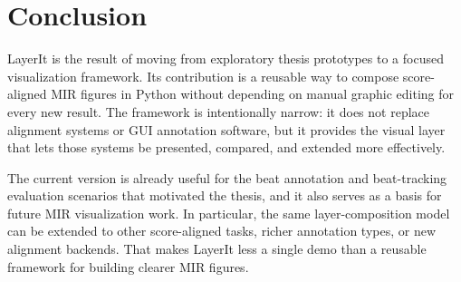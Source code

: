 \documentclass{article}
\begin{document}
\section{Conclusion}

LayerIt is the result of moving from exploratory thesis prototypes to a focused visualization framework. Its contribution is a reusable way to compose score-aligned MIR figures in Python without depending on manual graphic editing for every new result. The framework is intentionally narrow: it does not replace alignment systems or GUI annotation software, but it provides the visual layer that lets those systems be presented, compared, and extended more effectively.

The current version is already useful for the beat annotation and beat-tracking evaluation scenarios that motivated the thesis, and it also serves as a basis for future MIR visualization work. In particular, the same layer-composition model can be extended to other score-aligned tasks, richer annotation types, or new alignment backends. That makes LayerIt less a single demo than a reusable framework for building clearer MIR figures.


\end{document}
